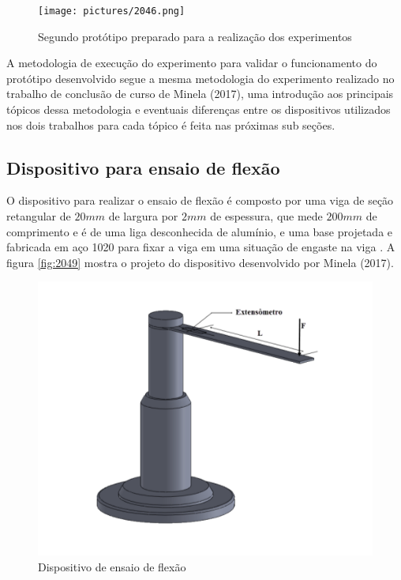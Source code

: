 \begin{figure}[H]
	\caption{\label{fig:2046} Segundo protótipo preparado para a realização dos experimentos}
		\begin{center}
			\texttt{[image: pictures/2046.png]}
		\end{center}
\end{figure}

A metodologia de execução do experimento para validar o funcionamento do protótipo desenvolvido segue a mesma metodologia do experimento realizado no trabalho de conclusão
de curso de Minela (2017), uma introdução aos principais tópicos dessa metodologia e eventuais diferenças entre os dispositivos utilizados nos dois trabalhos para cada tópico é feita
nas próximas sub seções.

\subsection{Dispositivo para ensaio de flexão}

O dispositivo para realizar o ensaio de flexão é composto por uma viga de seção retangular de $20mm$ de largura por $2mm$ de espessura, que mede $200mm$
de comprimento e é de uma liga desconhecida de alumínio, e uma base projetada e fabricada em aço 1020 para fixar a viga em uma situação de engaste na viga \autocite{Minela2017}.
A figura \autoref{fig:2049} mostra o projeto do dispositivo desenvolvido por Minela (2017).

\begin{figure}[htb]
	\caption{\label{fig:2049} Dispositivo de ensaio de flexão}
	\begin{center}
		\includegraphics[width=\textwidth]{pictures/2049.png}
	\end{center}
\end{figure}

